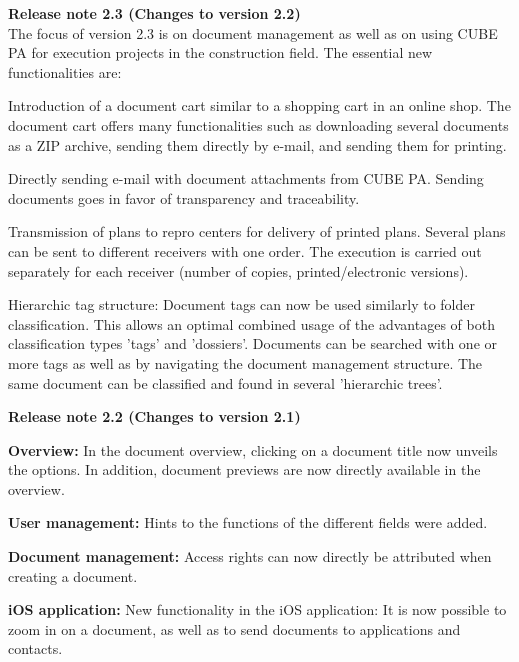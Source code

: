 \vspace{\baselineskip}

\textbf{Release note 2.3 (Changes to version 2.2)} \\

The focus of version 2.3 is on document management as well as on using CUBE PA for execution projects in the construction field. The essential new functionalities are:
\begin{compactitem}
	\item Introduction of a document cart similar to a shopping cart in an online shop. The document cart offers many functionalities such as downloading several documents as a ZIP archive, sending them directly by e-mail, and sending them for printing.
	\item Directly sending e-mail with document attachments from CUBE PA. Sending documents goes in favor of transparency and traceability.
	\item Transmission of plans to repro centers for delivery of printed plans. Several plans can be sent to different receivers with one order. The execution is carried out separately for each receiver (number of copies, printed/electronic versions).
	\item Hierarchic tag structure: Document tags can now be used similarly to folder classification. This allows an optimal combined usage of the advantages of both classification types 'tags' and 'dossiers'. Documents can be searched with one or more tags as well as by navigating the document management structure. The same document can be classified and found in several 'hierarchic trees'.
\end{compactitem}

\vspace{\baselineskip}

\textbf{Release note 2.2 (Changes to version 2.1)} \\

\begin{compactitem}
	\item \textbf{Overview:} In the document overview, clicking on a document title now unveils the options. In addition, document previews are now directly available in the overview.
	\item \textbf{User management:} Hints to the functions of the different fields were added.
	\item \textbf{Document management:} Access rights can now directly be attributed when creating a document.
	\item \textbf{iOS application:} New functionality in the iOS application: It is now possible to zoom in on a document, as well as to send documents to applications and contacts.
\end{compactitem}

